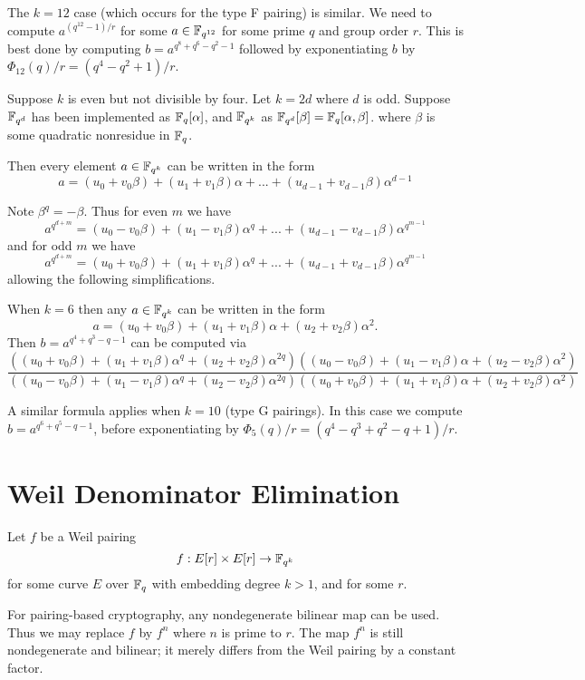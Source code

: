 The $k=12$ case (which occurs for the type F pairing) is similar.
We need to compute $a^{(q^12-1)/r}$ for some $a \in \mathbb{F}_{q^{12}}$
for some prime $q$ and group order $r$.
This is best done by computing $b=a^{q^8 +q^6 -q^2 -1}$ followed by
exponentiating $b$ by $\Phi_{12}(q)/r = (q^4 - q^2 + 1)/r$.

Suppose $k$ is even but not divisible by four.
Let $k = 2 d$ where $d$ is odd. Suppose
$\mathbb{F}_{q^d}$ has been implemented as $\mathbb{F}_q[\alpha]$, and $\mathbb{F}_{q^k}$ as
$\mathbb{F}_{q^d}[\beta] = \mathbb{F}_q[\alpha, \beta]$.
where $\beta$ is some quadratic nonresidue in $\mathbb{F}_q$.

Then every element $a\in \mathbb{F}_{q^k}$ can be written in the form
\[ a = (u_0 + v_0 \beta)
+ (u_1 + v_1 \beta) \alpha
+ ... + (u_{d-1} + v_{d-1} \beta) \alpha^{d-1} \]

Note $\beta^q = -\beta$.
Thus for even $m$ we have
\[ a^{q^{d + m}} = (u_0 - v_0 \beta)
+ (u_1 - v_1 \beta) \alpha^q
+ ... + (u_{d-1} - v_{d-1} \beta) \alpha^{q^{m-1}} \]
and for odd $m$ we have
\[ a^{q^{d + m}} = (u_0 + v_0 \beta)
+ (u_1 + v_1 \beta) \alpha^q
+ ... + (u_{d-1} + v_{d-1} \beta) \alpha^{q^{m-1}} \]
allowing the following simplifications.

When $k=6$ then any $a \in \mathbb{F}_{q^k}$ can be written in the form
\[ a = (u_0 + v_0 \beta)
+ (u_1 + v_1 \beta) \alpha
+ (u_2 + v_2 \beta) \alpha^2 . \]
Then $b = a^{q^4 + q^3 - q - 1}$
can be computed via
\[
\frac
{
\left(
(u_0 + v_0 \beta)
+ (u_1 + v_1 \beta) \alpha^q
+ (u_2 + v_2 \beta) \alpha^{2q}
\right)
\left(
(u_0 - v_0 \beta)
+ (u_1 - v_1 \beta) \alpha
+ (u_2 - v_2 \beta) \alpha^2
\right)
}
{
\left(
(u_0 - v_0 \beta)
+ (u_1 - v_1 \beta) \alpha^q
+ (u_2 - v_2 \beta) \alpha^{2q}
\right)
\left(
(u_0 + v_0 \beta)
+ (u_1 + v_1 \beta) \alpha
+ (u_2 + v_2 \beta) \alpha^2
\right)
}
\]

A similar formula applies when $k=10$ (type G pairings).
In this case we compute $b = a^{q^6 + q^5 - q - 1}$, before
exponentiating by $\Phi_5(q) / r = (q^4 - q^3 + q^2 - q + 1)/r$.

\section {Weil Denominator Elimination}

Let $f$ be a Weil pairing
\[ f:E[r] \times E[r] \rightarrow \mathbb{F}_{q^k} \]
for some curve $E$ over $\mathbb{F}_q$ with embedding degree $k > 1$, and for some
$r$.

For pairing-based cryptography, any nondegenerate bilinear map can be used.
Thus we may replace $f$ by $f^n$ where $n$ is prime to $r$.
The map $f^n$ is still nondegenerate and bilinear; it merely differs from the
Weil pairing by a constant factor.

